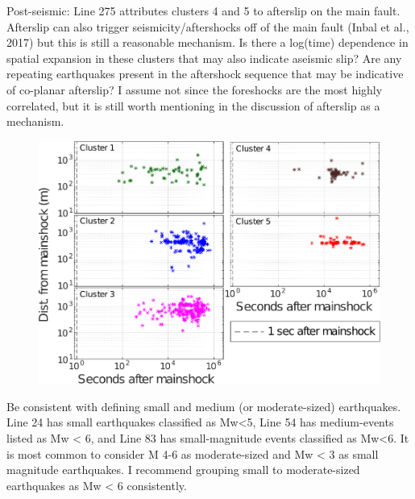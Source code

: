 \documentclass[10pt]{extarticle}
\begin{document}
\begin{ReviewerComment}{2}
\noindent 
Post-seismic: Line 275 attributes clusters 4 and 5 to afterslip on the main fault. Afterslip can also trigger seismicity/aftershocks off of the main fault (Inbal et al., 2017) but this is still a reasonable mechanism. Is there a log(time) dependence in spatial expansion in these clusters that may also indicate aseismic slip? Are any repeating earthquakes present in the aftershock sequence that may be indicative of co-planar afterslip? I assume not since the foreshocks are the most highly correlated, but it is still worth mentioning in the discussion of afterslip as a mechanism.
\end{ReviewerComment}


\begin{Answer}
\begin{figure}[!h]
\begin{center}
 \includegraphics[width=0.7\linewidth]{S3_loglog_time.png} 
\end{center}
\end{figure}
 \WorkInProgressRevTask
\end{Answer}
%
%




\begin{ReviewerComment}{2}
\noindent 
Be consistent with defining small and medium (or moderate-sized) earthquakes. Line 24 has small earthquakes classified as  Mw<5, Line 54 has medium-events listed as Mw < 6, and Line 83 has small-magnitude events classified as Mw<6. It is most common to consider M 4-6 as moderate-sized and Mw < 3 as small magnitude earthquakes. I recommend grouping small to moderate-sized earthquakes as Mw < 6 consistently.

\end{ReviewerComment}


\begin{Answer}
 \WorkInProgressRevTask
\end{Answer}
%
%
\end{document}

